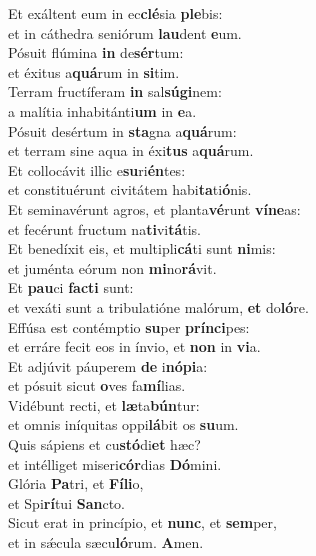 \evenverse Et exáltent eum in ec\textbf{clé}sia \textbf{ple}bis:~\*\\
\evenverse et in cáthedra seniórum \textbf{lau}dent \textbf{e}um.\\
\oddverse Pósuit flúmina \textbf{in} de\textbf{sér}tum:~\*\\
\oddverse et éxitus a\textbf{quá}rum in \textbf{si}tim.\\
\evenverse Terram fructíferam \textbf{in} sal\textbf{sú}\textbf{gi}nem:~\*\\
\evenverse a malítia inhabitánti\textbf{um} in \textbf{e}a.\\
\oddverse Pósuit desértum in \textbf{sta}gna a\textbf{quá}rum:~\*\\
\oddverse et terram sine aqua in éxi\textbf{tus} a\textbf{quá}rum.\\
\evenverse Et collocávit illic e\textbf{su}ri\textbf{én}tes:~\*\\
\evenverse et constituérunt civitátem habi\textbf{ta}ti\textbf{ó}nis.\\
\oddverse Et seminavérunt agros, et planta\textbf{vé}runt \textbf{ví}\textbf{ne}as:~\*\\
\oddverse et fecérunt fructum na\textbf{ti}vi\textbf{tá}tis.\\
\evenverse Et benedíxit eis, et multipli\textbf{cá}ti sunt \textbf{ni}mis:~\*\\
\evenverse et juménta eórum non \textbf{mi}no\textbf{rá}vit.\\
\oddverse Et \textbf{pau}ci \textbf{fa}\textbf{cti} sunt:~\*\\
\oddverse et vexáti sunt a tribulatióne malórum, \textbf{et} do\textbf{ló}re.\\
\evenverse Effúsa est contémptio \textbf{su}per \textbf{prín}\textbf{ci}pes:~\*\\
\evenverse et erráre fecit eos in ínvio, et \textbf{non} in \textbf{vi}a.\\
\oddverse Et adjúvit páuperem \textbf{de} i\textbf{nó}\textbf{pi}a:~\*\\
\oddverse et pósuit sicut \textbf{o}ves fa\textbf{mí}lias.\\
\evenverse Vidébunt recti, et \textbf{læ}ta\textbf{bún}tur:~\*\\
\evenverse et omnis iníquitas oppi\textbf{lá}bit os \textbf{su}um.\\
\oddverse Quis sápiens et cu\textbf{stó}di\textbf{et} hæc?~\*\\
\oddverse et intélliget miseri\textbf{cór}dias \textbf{Dó}mini.\\
\evenverse Glória \textbf{Pa}tri, et \textbf{Fí}\textbf{li}o,~\*\\
\evenverse et Spi\textbf{rí}tui \textbf{San}cto.\\
\oddverse Sicut erat in princípio, et \textbf{nunc}, et \textbf{sem}per,~\*\\
\oddverse et in sǽcula sæcu\textbf{ló}rum. \textbf{A}men.\\
